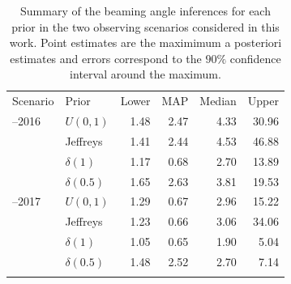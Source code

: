 \documentclass[twocolumn,nofootinbib]{revtex4-1}
\begin{document}
\begin{table}
\centering
\begin{tabular}{llrrrr}
  \toprule
  Scenario & Prior & Lower & MAP & Median & Upper \\
  \colrule
  2015--2016 & $U(0,1)$ & 1.48 & 2.47 & 4.33 & 30.96\\
    & Jeffreys & 1.41 & 2.44 & 4.53 & 46.88\\
    & $\delta(1)$ &1.17 & 0.68 & 2.70 & 13.89\\
    & $\delta(0.5)$ &1.65 & 2.63 & 3.81 & 19.53\\
  \colrule
  2016--2017 & $U(0,1)$ & 1.29 & 0.67 & 2.96 & 15.22\\
    & Jeffreys & 1.23 & 0.66 & 3.06 & 34.06\\
    & $\delta(1)$ & 1.05 & 0.65 & 1.90 & 5.04\\
    & $\delta(0.5)$ & 1.48 & 2.52 & 2.70 & 7.14\\
\botrule
\end{tabular}
\caption{Summary of the beaming angle inferences for each prior in the two observing scenarios considered in this work.
    Point estimates are the maximimum a posteriori estimates and errors correspond to the $90\%$ confidence interval around the maximum.
    \label{table:aligo_beam_inference}}
\end{table}

%
\end{document}
